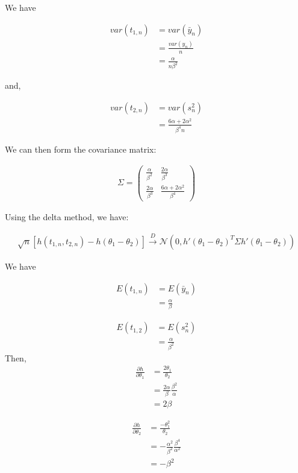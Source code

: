 \documentclass[11pt]{article}
\begin{document}
We have

\begin{align*}
    var(t_{1,n}) &= var(\bar{y}_n)\\
    &= \frac{var(y_n)}{n} \\
    &= \frac{\alpha}{n\beta^2}
\end{align*}

and,

\begin{align*}
    var(t_{2,n}) &= var(s^2_n)\\
    &= \frac{6\alpha+2\alpha^2}{\beta^4n}
\end{align*}

We can then form the covariance matrix:


\begin{align*}
    \Sigma = \begin{pmatrix}
\frac{\alpha}{\beta^2} &\frac{2\alpha}{\beta^3}\\
\frac{2\alpha}{\beta^3} & \frac{6\alpha+2\alpha^2}{\beta^4}
\end{pmatrix} 
\end{align*}

Using the delta method, we have:

\begin{align*}
    \sqrt{n}[h(t_{1, n}, t_{2, n}) - h(\theta_1 - \theta_2)] \xrightarrow[]{D} \mathcal{N}(0, h'(\theta_1 - \theta_2)^T\Sigma h'(\theta_1 - \theta_2))
\end{align*}

We have 

\begin{align*}
    E(t_{1,n}) &= E(\bar{y}_n)\\
    &= \frac{\alpha}{\beta}
\end{align*}

\begin{align*}
    E(t_{1,2}) &= E(s^2_n)\\
    &= \frac{\alpha}{\beta^2}
\end{align*}
Then, 
\begin{align*}
    \frac{\partial h}{\partial \theta_1} &= \frac{2\theta_1}{\theta_2}\\
    &= \frac{2\alpha}{\beta} \frac{\beta^2}{\alpha}\\
    &= 2\beta
\end{align*}

\begin{align*}
    \frac{\partial h}{\partial \theta_2} &= \frac{-\theta_1^2}{\theta_2}\\
    &= -\frac{\alpha^2}{\beta^2} \frac{\beta^4}{\alpha^2}\\
    &= -\beta^2
\end{align*}
\end{document}
